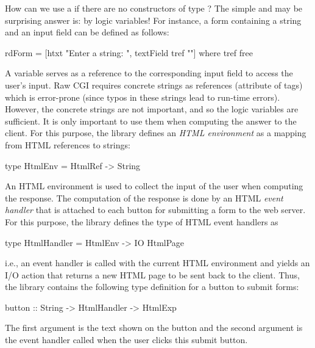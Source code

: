 How can we use a  if there are no constructors
of type ?
The simple and may be surprising answer is: by logic variables!
For instance, a form containing a string
and an input field can be defined as follows:
%
\begin{curry}
rdForm = [htxt "Enter a string: ", textField tref ""]
 where tref free
\end{curry} %
%
A  variable serves as a reference to the corresponding
input field to access the user's input. Raw CGI requires concrete
strings as references (attribute  of  tags)
which is error-prone (since typos in these strings lead to
run-time errors).
However, the concrete strings are not important, and so the
logic variables are sufficient. It is only important
to use them when computing the answer to the client.
For this purpose, the library  defines
an \emph{HTML environment} as a mapping
from HTML references to strings:
%
\begin{curry}
type HtmlEnv = HtmlRef -> String
\end{curry}
%
An HTML environment is used to collect the input of the user
when computing the response. The computation of the response is done
by an HTML \emph{event handler}
that is attached to each button for submitting a form to the web server.
For this purpose, the library 
defines the type of HTML event handlers as
%
\begin{curry}
type HtmlHandler = HtmlEnv -> IO HtmlPage
\end{curry}
%
i.e., an event handler is called with the current HTML environment and
yields an I/O action that returns a new HTML page to be sent back to the client.
Thus, the library  contains the following type definition
for a button to submit forms:
%
\begin{curry}
button :: String -> HtmlHandler -> HtmlExp
\end{curry}
%
The first argument is the text shown on the button
and the second argument is the event handler called when the user
clicks this submit button.

